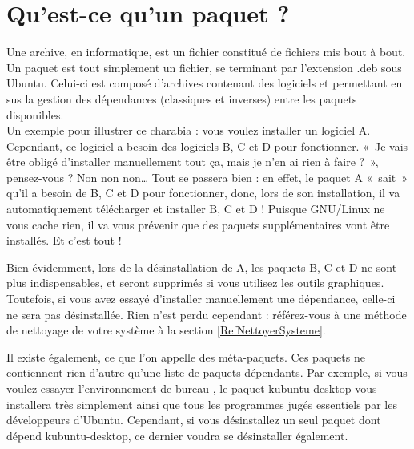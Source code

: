 \section{Qu'est-ce qu'un paquet ?}
Une archive, en informatique, est un fichier constitué de fichiers mis bout à bout. Un paquet est tout simplement un fichier, se terminant par l'extension .deb sous Ubuntu. Celui-ci est composé d'archives contenant des logiciels et permettant en sus la gestion des dépendances (classiques et inverses) entre les paquets disponibles.\\
Un exemple pour illustrer ce charabia : vous voulez installer un logiciel A. Cependant, ce logiciel a besoin des logiciels B, C et D pour fonctionner. «~Je vais être obligé d'installer manuellement tout ça, mais je n'en ai rien à faire ?~», pensez-vous ? Non non non\ldots{} Tout se passera bien : en effet, le paquet A «~sait~» qu'il a besoin de B, C et D pour fonctionner, donc, lors de son installation, il va automatiquement télécharger et installer B, C et D ! Puisque GNU/Linux ne vous cache rien, il va vous prévenir que des paquets supplémentaires vont être installés. Et c'est tout !\par
Bien évidemment, lors de la désinstallation de A, les paquets B, C et D ne sont plus indispensables, et seront supprimés si vous utilisez les outils graphiques. Toutefois, si vous avez essayé d'installer manuellement une dépendance, celle-ci ne sera pas désinstallée. Rien n'est perdu cependant : référez-vous à une méthode de nettoyage de votre système à la section \ref{RefNettoyerSysteme}. 
\begin{nota}
Il existe également, ce que l'on appelle des méta-paquets. Ces paquets ne contiennent rien d'autre qu'une liste de paquets dépendants. Par exemple, si vous voulez essayer l'environnement de bureau , le paquet kubuntu-desktop vous installera très simplement  ainsi que tous les programmes  jugés essentiels par les développeurs d'Ubuntu. Cependant, si vous désinstallez un seul paquet dont dépend kubuntu-desktop, ce dernier voudra se désinstaller également.
\end{nota}
